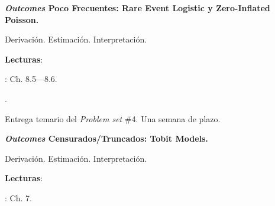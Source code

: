 \documentclass[letterpaper]{article}
\renewenvironment{itemize}{
  \begin{list}{}{
    \setlength{\leftmargin}{1.5em}
  }
}{
  \end{list}
}
\begin{document}
\begin{enumerate}[label=\roman*.]
      \begin{itemize} 
        \item[18.] {\bf \emph{Outcomes} Poco Frecuentes: Rare Event Logistic y Zero-Inflated Poisson.}
        \begin{itemize} 
          \item[$\circ$] Derivaci\'on. Estimaci\'on. Interpretaci\'on.
          \item[$\circ$] {\bf Lecturas}: 
            \begin{itemize} 
              \item[$\diamond$] \textcite{Long2001}: Ch. 8.5---8.6.
              \item[$\diamond$] \href{https://github.com/hbahamonde/MLE/raw/master/Readings/King_2001.pdf}{\textcite{King2001}}.
            \end{itemize}
        \end{itemize}
      \end{itemize}


\item[{\color{red}\Pointinghand}] Entrega temario del \emph{Problem set} \#4. Una semana de plazo.


     \begin{itemize} 
        \item[19.] {\bf \emph{Outcomes} Censurados/Truncados: Tobit Models.}
        \begin{itemize} 
          \item[$\circ$] Derivaci\'on. Estimaci\'on. Interpretaci\'on.
          \item[$\circ$] {\bf Lecturas}: 
            \begin{itemize} 
              \item[$\diamond$] \textcite{Long2001}: Ch. 7.
            \end{itemize}
        \end{itemize}
      \end{itemize}



\end{enumerate}
\end{document}
